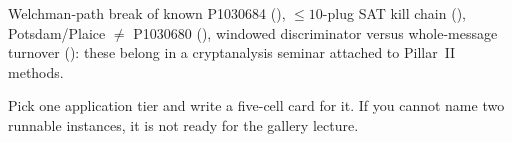 Welchman-path break of known P1030684 (), $\le 10$-plug SAT kill
chain (), Potsdam/Plaice $\neq$ P1030680 (), windowed
discriminator versus whole-message turnover (): these belong in a
cryptanalysis seminar attached to Pillar~II methods.


\begin{exercise}
Pick one application tier and write a five-cell card for it.
If you cannot name two runnable instances, it is not ready for the gallery
lecture.
\end{exercise}

